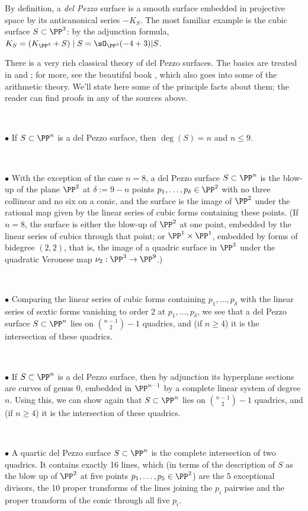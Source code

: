 By definition,
a \emph{del Pezzo} surface is a smooth surface embedded in projective space by its anticanonical series $-K_S$. The most familiar example is the cubic surface $S \subset \PP^3$: by the adjunction formula, $K_S = (K_{\PP^3}+S)\mid S
= \sO_{\PP^3}(-4+3)|S$. 


There is a very rich classical theory of del Pezzo surfaces. The basics are treated in \cite{Beauville} and \cite{Griffiths-Harris1978}; for more, see the
beautiful book \cite{Manin}, which also goes into some of the arithmetic theory. We'll state here some of the principle facts about them; the reader can find proofs in any of the sources above.

\

$\bullet$ If $S \subset \PP^n$ is a del Pezzo surface, then $\deg(S) = n$ and $n \leq 9$.

\

$\bullet$ With the exception of the case $n=8$, a del Pezzo surface $S \subset \PP^n$ is the blow-up of the plane $\PP^2$ at $\delta := 9-n$ points $p_1,\dots,p_\delta \in \PP^2$ with no three collinear and no six on a conic, 
and the surface is the image of $\PP^2$ under the rational map given by  the linear series  of cubic forms containing these points. (If $n=8$, the surface
is either the blow-up of $\PP^2$  at one point, embedded by the linear series of cubics through that point; or $\PP^1 \times \PP^1$, embedded by forms of bidegree $(2,2)$, that is,  the image of a quadric surface in $\PP^3$ under the quadratic Veronese map $\nu_2 : \PP^3 \to \PP^9$.) 

\

$\bullet$ Comparing the linear series  of cubic forms containing $p_1,\dots,p_\delta$ with the linear series  of sextic forms vanishing to order 2 at $p_1,\dots,p_\delta$, we see that a del Pezzo surface $S \subset \PP^n$ lies on $\binom{n-1}{2} - 1$ quadrics, and (if $n \geq 4$) it is the intersection of these quadrics.

\

$\bullet$ If $S \subset \PP^n$ is a del Pezzo surface, then by adjunction its hyperplane sections are curves of genus 0, embedded in $\PP^{n-1}$ by a complete linear system of degree $n$. Using this, we can show again that $S \subset \PP^n$ lies on $\binom{n-1}{2} - 1$ quadrics, and (if $n \geq 4$) it is the intersection of these quadrics.

\

$\bullet$ A quartic del Pezzo surface $S \subset \PP^n$ is the complete intersection of two quadrics. It contains exactly 16 lines, which (in terms of the description of $S$ as the blow up of $\PP^2$ at five points $p_1,\dots,p_5 \in \PP^2$) are the 5 exceptional divisors, the 10 proper transforms of the lines joining the $p_i$ pairwise and the proper transform of the conic through all five $p_i$.


